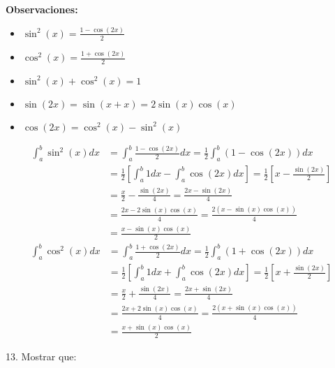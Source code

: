 \documentclass[12pt]{article}
\begin{document}
\begin{enumerate}[\hspace{9px} a)]
        \textbf{Observaciones:}
        \begin{itemize}
            \item \(\sin^2(x) = \displaystyle\frac{1-\cos(2x)}{2}\)
            \item \(\cos^2(x) = \displaystyle\frac{1+\cos(2x)}{2}\)
            \item \(\sin^2(x)+\cos^2(x)=1\)
            \item \(\sin(2x) = \sin(x+x)=2\sin(x)\cos(x)\)
            \item \(\cos(2x) = \cos^2(x)-\sin^2(x)\)
        \end{itemize}
        \begin{align*}
            \int_{a}^{b}\sin^2(x)dx& = \int_{a}^{b}\frac{1-\cos(2x)}{2}dx = \frac{1}{2}\int_{a}^{b}(1-\cos(2x))dx \\
            &= \frac{1}{2}\left[\int_{a}^{b}1dx - \int_{a}^{b}\cos(2x)dx\right] = \frac{1}{2}\left[x - \frac{\sin(2x)}{2}\right] \\
            &=\frac{x}{2} - \frac{\sin(2x)}{4} = \frac{2x-\sin(2x)}{4} \\
            &= \frac{2x-2\sin(x)\cos(x)}{4} = \frac{2(x-\sin(x)\cos(x))}{4} \\
            &= \frac{x-\sin(x)\cos(x)}{2}
        \end{align*}
        \begin{align*}
            \int_{a}^{b}\cos^2(x)dx& = \int_{a}^{b}\frac{1+\cos(2x)}{2}dx = \frac{1}{2}\int_{a}^{b}(1+\cos(2x))dx \\
            &= \frac{1}{2}\left[\int_{a}^{b}1dx + \int_{a}^{b}\cos(2x)dx\right] = \frac{1}{2}\left[x + \frac{\sin(2x)}{2}\right] \\
            &=\frac{x}{2} + \frac{\sin(2x)}{4} = \frac{2x+\sin(2x)}{4} \\
            &= \frac{2x+2\sin(x)\cos(x)}{4} = \frac{2(x+\sin(x)\cos(x))}{4} \\
            &= \frac{x+\sin(x)\cos(x)}{2}
        \end{align*}

\end{enumerate}

13. Mostrar que:
\end{document}
